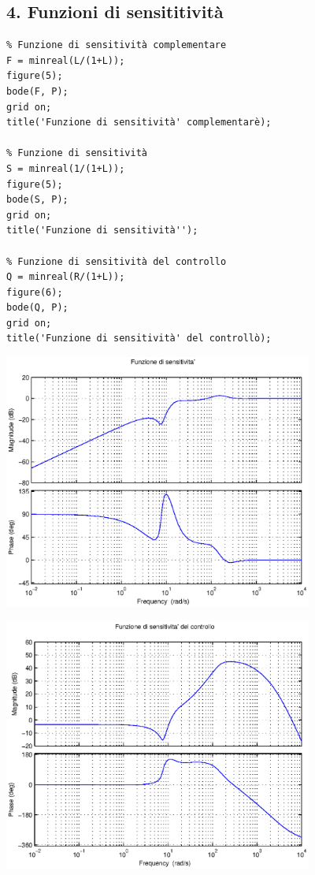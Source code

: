 \documentclass{article}
\begin{document}
\subsection*{4. Funzioni di sensititività}

\begin{verbatim}
% Funzione di sensitività complementare
F = minreal(L/(1+L));
figure(5);
bode(F, P);
grid on;
title('Funzione di sensitività' complementarè);

% Funzione di sensitività
S = minreal(1/(1+L));
figure(5);
bode(S, P);
grid on;
title('Funzione di sensitività'');

% Funzione di sensitività del controllo
Q = minreal(R/(1+L));
figure(6);
bode(Q, P);
grid on;
title('Funzione di sensitività' del controllò);
\end{verbatim}

\includegraphics [width=4in]{prog6RADICI_15.eps}

\includegraphics [width=4in]{prog6RADICI_16.eps}
\end{document}
